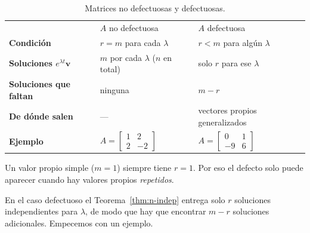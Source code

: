 \begin{table}[H]
\centering
\renewcommand{\arraystretch}{1.4}
\begin{tabular}{>{\bfseries}l l l}
\rowcolor{bbe!15}
 & \textcolor{bbe}{$A$ no defectuosa} & \textcolor{bbe}{$A$ defectuosa} \\
Condici\'on & $r=m$ para cada $\lambda$ & $r<m$ para alg\'un $\lambda$ \\
Soluciones $e^{\lambda t}\mathbf v$ & $m$ por cada $\lambda$ ($n$ en total) & solo $r$ para ese $\lambda$ \\
Soluciones que faltan & ninguna & $m-r$ \\
De d\'onde salen & --- & vectores propios generalizados \\
Ejemplo & $A=\begin{bmatrix}1&2\\2&-2\end{bmatrix}$ & $A=\begin{bmatrix}0&1\\-9&6\end{bmatrix}$ \\
\end{tabular}
\caption{Matrices no defectuosas y defectuosas.}
\label{tab:defecto}
\end{table}

\begin{remark}
Un valor propio simple ($m=1$) siempre tiene $r=1$. Por eso el defecto solo puede aparecer cuando hay valores propios \emph{repetidos}.
\end{remark}

En el caso defectuoso el Teorema~\ref{thm:n-indep} entrega solo $r$ soluciones independientes para $\lambda$, de modo que hay que encontrar $m-r$ soluciones adicionales. Empecemos con un ejemplo.


